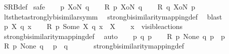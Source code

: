 \begin{isabellebody}
\isamarkupfalse%
\ SRB{\isacharunderscore}{\kern0pt}def\isanewline
{}\isamarkupfalse%
\ {\isacharparenleft}{\kern0pt}safe{\isacharparenright}{\kern0pt}\isanewline
\ \ \isamarkupfalse%
\ p\ XoN\ q\isanewline
\ \ \isamarkupfalse%
\ {\isacartoucheopen}{\isacharquery}{\kern0pt}R\ p\ XoN\ q{\isacartoucheclose}\isanewline
\ \ \isamarkupfalse%
\ {\isacartoucheopen}{\isacharquery}{\kern0pt}R\ q\ XoN\ p{\isacartoucheclose}\ \isamarkupfalse%
\ lts{\isacharunderscore}{\kern0pt}theta{\isachardot}{\kern0pt}strongly{\isacharunderscore}{\kern0pt}bisimilar{\isacharunderscore}{\kern0pt}symm\ \isamarkupfalse%
\ strong{\isacharunderscore}{\kern0pt}bisimilarity{\isacharunderscore}{\kern0pt}mapping{\isacharunderscore}{\kern0pt}def\ \isamarkupfalse%
\ blast\isanewline
{}\isamarkupfalse%
\isanewline
\ \ \isamarkupfalse%
\ p\ X\ q\ x\isanewline
\ \ \isamarkupfalse%
\ {\isacartoucheopen}{\isacharquery}{\kern0pt}R\ p\ {\isacharparenleft}{\kern0pt}Some\ X{\isacharparenright}{\kern0pt}\ q{\isacartoucheclose}\ {\isacartoucheopen}x\ {\isasymin}\ X{\isacartoucheclose}\isanewline
\ \ \isamarkupfalse%
\ {\isacartoucheopen}x\ {\isasymin}\ visible{\isacharunderscore}{\kern0pt}actions{\isacartoucheclose}\ \isamarkupfalse%
\ strong{\isacharunderscore}{\kern0pt}bisimilarity{\isacharunderscore}{\kern0pt}mapping{\isacharunderscore}{\kern0pt}def\ \isamarkupfalse%
\ auto\isanewline
{}\isamarkupfalse%
\isanewline
\ \ \isamarkupfalse%
\ p\ q\ p{\isacharprime}{\kern0pt}\isanewline
\ \ \isamarkupfalse%
\ {\isacartoucheopen}{\isacharquery}{\kern0pt}R\ p\ None\ q{\isacartoucheclose}\ {\isacartoucheopen}p\ {\isasymlongmapsto}{\isasymtau}\ p{\isacharprime}{\kern0pt}{\isacartoucheclose}\isanewline
\isanewline
\ \ \isamarkupfalse%
\ {\isacartoucheopen}{\isacharquery}{\kern0pt}R\ p\ None\ q{\isacartoucheclose}\ \isamarkupfalse%
\ {\isacartoucheopen}{\isacharparenleft}{\kern0pt}{\isasymtheta}{\isacharparenleft}{\kern0pt}p{\isacharparenright}{\kern0pt}{\isacharparenright}{\kern0pt}\ {\isasymleftrightarrow}\ {\isacharparenleft}{\kern0pt}{\isasymtheta}{\isacharparenleft}{\kern0pt}q{\isacharparenright}{\kern0pt}{\isacharparenright}{\kern0pt}{\isacartoucheclose}\ \isanewline
\ \ \ \ \isamarkupfalse%
\ strong{\isacharunderscore}{\kern0pt}bisimilarity{\isacharunderscore}{\kern0pt}mapping{\isacharunderscore}{\kern0pt}def\ \isamarkupfalse%

\end{isabellebody}
